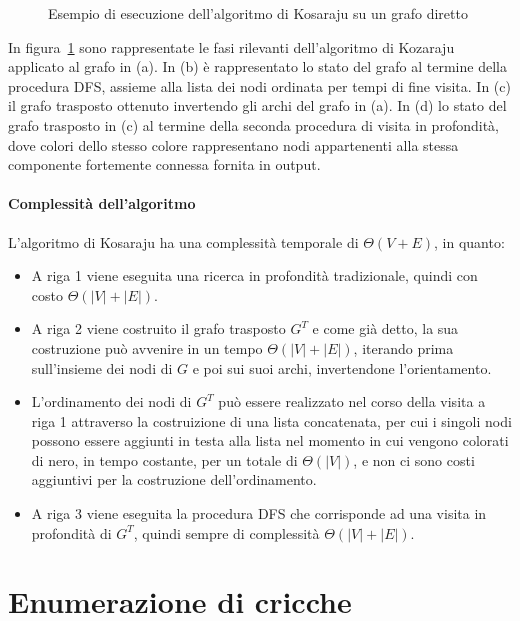 \begin{figure}
    \resizebox{!}{4cm}{
        }
    \resizebox{!}{4cm}{
        }
    \caption{Esempio di esecuzione dell'algoritmo di Kosaraju su un grafo diretto}
    \label{fig:kozaraju_example}
\end{figure}

In figura~\ref{fig:kozaraju_example} sono rappresentate le fasi rilevanti dell'algoritmo di Kozaraju
applicato al grafo in (a).
In (b) \`e rappresentato lo stato del grafo al termine della procedura DFS, assieme alla lista dei nodi ordinata
per tempi di fine visita.
In (c) il grafo trasposto ottenuto invertendo gli archi del grafo in (a).
In (d) lo stato del grafo trasposto in (c) al termine della seconda procedura di visita in
profondit\`a, dove colori dello stesso colore rappresentano nodi appartenenti alla stessa componente fortemente
connessa fornita in output.

\paragraph{Complessit\`a dell'algoritmo}
L'algoritmo di Kosaraju ha una complessit\`a temporale di $\Theta(V + E)$, in quanto:
\begin{itemize}
    \item A riga 1 viene eseguita una ricerca in profondit\`a tradizionale, quindi con costo $\Theta(|V| + |E|)$.
    \item A riga 2 viene costruito il grafo trasposto $G^T$ e come gi\`a detto, la sua costruzione pu\`o avvenire in
    un tempo $\Theta(|V| + |E|)$, iterando prima sull'insieme dei nodi di $G$ e poi sui suoi archi, invertendone
    l'orientamento.
    \item L'ordinamento dei nodi di $G^T$ pu\`o essere realizzato nel corso della visita a riga 1 attraverso la
    costruizione di una lista concatenata, per cui i singoli nodi possono essere aggiunti in testa alla lista nel
    momento in cui vengono colorati di nero, in tempo costante, per un totale di $\Theta(|V|)$, e non ci sono costi
    aggiuntivi per la costruzione dell'ordinamento.
    \item A riga 3 viene eseguita la procedura DFS che corrisponde ad una visita in profondit\`a di $G^T$, quindi
    sempre di complessit\`a $\Theta(|V| + |E|)$.
\end{itemize}

\section{Enumerazione di cricche}\label{sec:enumerazione-di-cricche}

